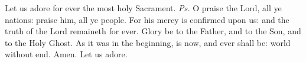\begin{enpars}\noindent Let us adore for ever the most holy Sacrament. \textit{Ps.} O praise the Lord, all ye nations: praise him, all ye people. For his mercy is confirmed upon us: and the truth of the Lord remaineth for ever. Glory be to the Father, and to the Son, and to the Holy Ghost. As it was in the beginning, is now, and ever shall be: world without end. Amen. Let us adore.\end{enpars}